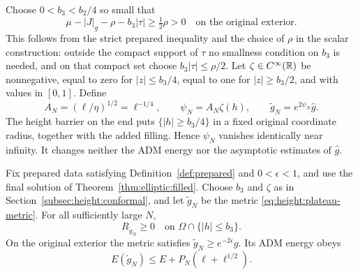 Choose $0<b_3<b_2/4$ so small that
\begin{equation}\label{eq:height:strict-margin}
 \mu-|J|_g-\rho-b_3|\tau|\ge\tfrac12\rho>0
 \quad\text{on the original exterior}.
\end{equation}
This follows from the strict prepared inequality and the choice of
$\rho$ in the scalar construction: outside the compact support of
$\tau$ no smallness condition on $b_3$ is needed, and on that compact
set choose $b_3|\tau|\le\rho/2$.  Let $\zeta\in C^\infty(\mathbb R)$ be
nonnegative, equal to zero for $|z|\le b_3/4$, equal to one for
$|z|\ge b_3/2$, and with values in $[0,1]$.  Define
\begin{equation}\label{eq:height:plateau-metric}
 A_N=(\ell/\eta)^{1/2}=\ell^{-1/4},\qquad
 \psi_N= A_N\zeta(h),\qquad
 \widetilde g_N=e^{2\psi_N}\widehat g.
\end{equation}
The height barrier on the end puts $\{|h|\ge b_3/4\}$ in a fixed
original coordinate radius, together with the added filling.  Hence
$\psi_N$ vanishes identically near infinity.  It changes neither the
ADM energy nor the asymptotic estimates of $\widehat g$.

\begin{lemma}
\label{lem:height:curvature}
Fix prepared data satisfying Definition~\ref{def:prepared} and
$0<\epsilon<1$, and use the final solution of
Theorem~\ref{thm:elliptic:filled}.  Choose $b_3$ and $\zeta$ as in
Section~\ref{subsec:height:conformal}, and let $\widetilde g_N$ be
the metric \eqref{eq:height:plateau-metric}.
For all sufficiently large $N$,
\[
 R_{\widetilde g_N}\ge0
 \quad\text{on }\Omega\cap\{|h|\le b_3\}.
\]
On the original exterior the metric satisfies
$\widetilde g_N\ge e^{-2\epsilon}g$.  Its ADM energy obeys
\begin{equation}\label{eq:height:energy-upper}
 E(\widetilde g_N)\le E+P_N(\ell+\ell^{1/2}).
\end{equation}
\end{lemma}

